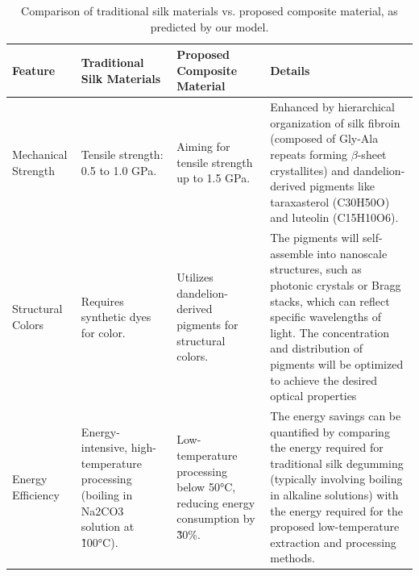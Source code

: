 \documentclass{article}
\begin{document}
\begin{table}[th!]
 \centering
\caption{Comparison of traditional silk materials vs. proposed composite material, as predicted by our model. }
\begin{tabularx}{1.0\textwidth}{XXXX}
\toprule 			
\textbf{Feature } & \textbf{Traditional Silk Materials} & \textbf{Proposed Composite Material} &	\textbf{Details}
\tabularnewline
\midrule
Mechanical Strength	 & Tensile strength: 0.5 to 1.0 GPa. & Aiming for tensile strength up to 1.5 GPa. & Enhanced by hierarchical organization of silk fibroin (composed of Gly-Ala repeats forming $\beta$-sheet crystallites) and dandelion-derived pigments like taraxasterol (C30H50O) and luteolin (C15H10O6). 
\tabularnewline
\midrule
Structural Colors &	Requires synthetic dyes for color. &	Utilizes dandelion-derived pigments for structural colors. &	The pigments will self-assemble into nanoscale structures, such as photonic crystals or Bragg stacks, which can reflect specific wavelengths of light. The concentration and distribution of pigments will be optimized to achieve the desired optical properties
\tabularnewline
\midrule
Energy Efficiency	& Energy-intensive, high-temperature processing (boiling in Na2CO3 solution at \~100°C). &	Low-temperature processing below 50°C, reducing energy consumption by \~30\%. &	The energy savings can be quantified by comparing the energy required for
traditional silk degumming (typically involving boiling in alkaline solutions) with the energy required for the proposed low-temperature extraction and processing methods.
\tabularnewline
\midrule
\end{tabularx}
\label{tb: comparison}
\end{table}
\end{document}
